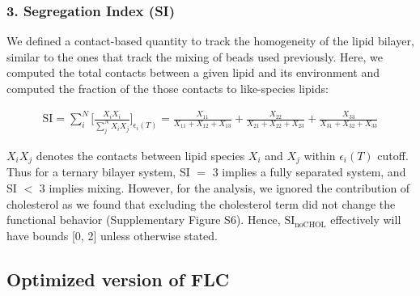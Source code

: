 \documentclass{biophys-new}
\begin{document}
\subsubsection*{3. Segregation Index (SI)}

We defined a contact-based quantity to track the homogeneity of the lipid bilayer, similar to the ones that track the mixing of beads used previously\cite{Marigo2012, Kumar2020}.
Here, we computed the total contacts between a given lipid and its environment and computed the fraction of the those contacts to like-species lipids:

\begin{equation}
    \begin{aligned}
        \label{eq:CLT}
        \text{SI} = \sum_{i}^{N}\Bigg[\frac{X_iX_i}{\sum_{j}^{N}X_iX_j}\Bigg]_{\text{$\epsilon_i(T)$}} = \frac{X_{11}}{X_{11} + X_{12} + X_{13}} + \frac{X_{22}}{X_{21} + X_{22} + X_{23}} + \frac{X_{33}}{X_{31} + X_{32} + X_{33}}
    \end{aligned}
\end{equation}

$X_iX_j$ denotes the contacts between lipid species $X_i$ and $X_j$ within $\epsilon_i(T)$ cutoff.
Thus for a ternary bilayer system, SI $=$ 3 implies a fully separated system, and SI $<$ 3 implies mixing.
However, for the analysis, we ignored the contribution of cholesterol as we found that excluding the cholesterol term did not change the functional behavior (Supplementary Figure S6).
Hence, $\text{SI}_{\text{noCHOL}}$ effectively will have bounds [0, 2] unless otherwise stated.

\subsection*{Optimized version of FLC}
\end{document}
